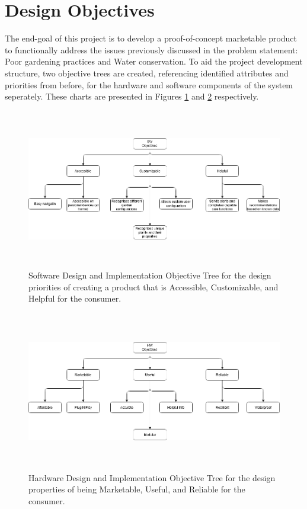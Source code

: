 \documentclass{report}
\begin{document}
\section{Design Objectives}
The end-goal of this project is to develop a proof-of-concept marketable product to functionally address the issues previously discussed in the problem statement: Poor gardening practices and Water conservation. To aid the project development structure, two objective trees are created, referencing identified attributes and priorities from before, for the hardware and software components of the system seperately. These charts are presented in Figures \ref{fig:SWTree} and \ref{fig:HWTree} respectively.
\begin{figure}[H] %
    \centering
    \includegraphics[height=2.75in]{PNGs/SW_Objective_Tree.png}
    \caption{Software Design and Implementation Objective Tree for the design priorities of creating a product that is Accessible, Customizable, and Helpful for the consumer.}
    \label{fig:SWTree}
\end{figure}
\begin{figure}[H] %
    \centering
    \includegraphics[height=2.75in]{PNGs/HW_Objective_Tree.png}
    \caption{Hardware Design and Implementation Objective Tree for the design properties of being Marketable, Useful, and Reliable for the consumer.}
    \label{fig:HWTree}
\end{figure}
\end{document}
